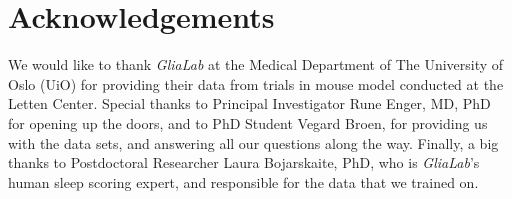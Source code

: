 \documentclass{article}
\begin{document}
\section*{Acknowledgements}
We would like to thank \textit{GliaLab} at the Medical Department of The University of Oslo (UiO) for providing their data from trials in mouse model conducted at the Letten Center. Special thanks to Principal Investigator Rune Enger, MD, PhD for opening up the doors, and to PhD Student Vegard Broen, for providing us with the data sets, and answering all our questions along the way. Finally, a big thanks to Postdoctoral Researcher Laura Bojarskaite, PhD, who is \textit{GliaLab}'s human sleep scoring expert, and responsible for the data that we trained on.



\end{document}
